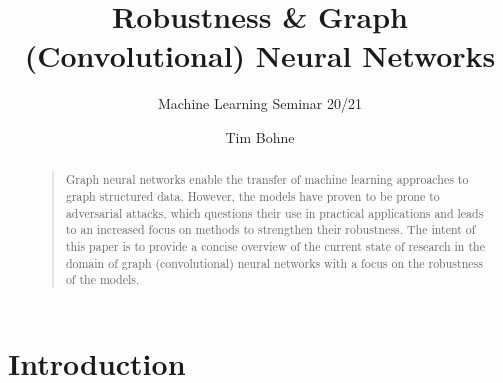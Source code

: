 \documentclass[a4paper,preprint]{sig-alternate}
\begin{document}
\title{Robustness \& Graph (Convolutional) Neural Networks}

\subtitle{Machine Learning Seminar 20/21}

%
\author{
%
\alignauthor Tim Bohne\\
}

\maketitle

\begin{abstract}
    \begin{quote}
    Graph neural networks enable the transfer of machine learning approaches to graph structured data.
    However, the models have proven to be prone to adversarial attacks, which questions their use in practical applications
    and leads to an increased focus on methods to strengthen their robustness. The intent of this paper is to provide a concise overview
    of the current state of research in the domain of graph (convolutional) neural networks with a focus on the robustness of the models. 
    \end{quote}
\end{abstract}

\section{Introduction}
\end{document}
